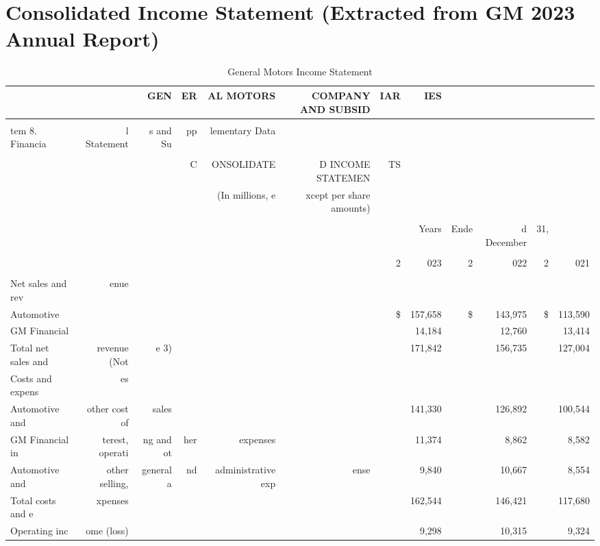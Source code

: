 \documentclass{article}
\begin{document}
\section*{Consolidated Income Statement (Extracted from GM 2023 Annual Report)}
\begin{table}[ht]
\centering
\caption{General Motors Income Statement}
\begin{tabular}{lrrrrrrrrrrr}
\toprule
 &  & GEN & ER & AL MOTORS & COMPANY AND SUBSID & IAR & IES &  &  &  &  \\
\midrule
 &  &  &  &  &  &  &  &  &  &  &  \\
tem 8. Financia & l Statement & s and Su & pp & lementary Data &  &  &  &  &  &  &  \\
 &  &  &  &  &  &  &  &  &  &  &  \\
 &  &  & C & ONSOLIDATE & D INCOME STATEMEN & TS &  &  &  &  &  \\
 &  &  &  & (In millions, e & xcept per share amounts) &  &  &  &  &  &  \\
 &  &  &  &  &  &  &  &  &  &  &  \\
 &  &  &  &  &  &  & Years & Ende & d December & 31, &  \\
 &  &  &  &  &  &  &  &  &  &  &  \\
 &  &  &  &  &  & 2 & 023 & 2 & 022 & 2 & 021 \\
 &  &  &  &  &  &  &  &  &  &  &  \\
Net sales and rev & enue &  &  &  &  &  &  &  &  &  &  \\
Automotive &  &  &  &  &  & \$ & 157,658 & \$ & 143,975 & \$ & 113,590 \\
GM Financial &  &  &  &  &  &  & 14,184 &  & 12,760 &  & 13,414 \\
Total net sales and & revenue (Not & e 3) &  &  &  &  & 171,842 &  & 156,735 &  & 127,004 \\
Costs and expens & es &  &  &  &  &  &  &  &  &  &  \\
Automotive and & other cost of & sales &  &  &  &  & 141,330 &  & 126,892 &  & 100,544 \\
GM Financial in & terest, operati & ng and ot & her & expenses &  &  & 11,374 &  & 8,862 &  & 8,582 \\
Automotive and & other selling, & general a & nd & administrative exp & ense &  & 9,840 &  & 10,667 &  & 8,554 \\
Total costs and e & xpenses &  &  &  &  &  & 162,544 &  & 146,421 &  & 117,680 \\
Operating inc & ome (loss) &  &  &  &  &  & 9,298 &  & 10,315 &  & 9,324 \\

\end{tabular}
\end{table}
\end{document}
